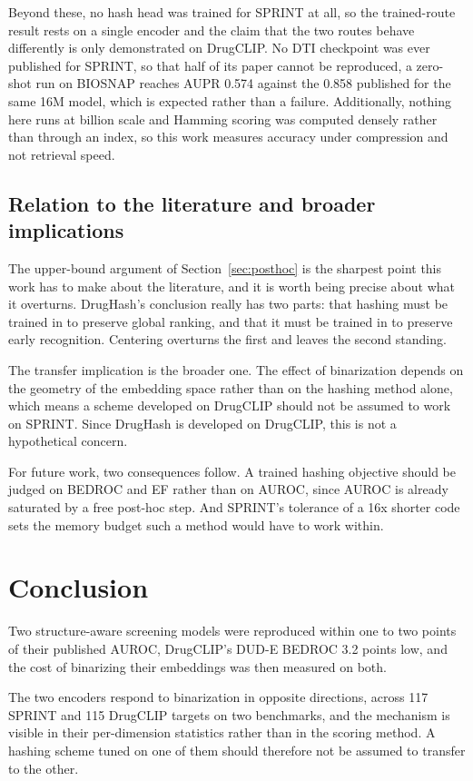 \documentclass[10pt,a4paper]{article}
\begin{document}
Beyond these, no hash head was trained for SPRINT at all, so the trained-route result rests on
a single encoder and the claim that the two routes behave differently is only demonstrated on
DrugCLIP. No DTI checkpoint was ever published for SPRINT, so that half of its paper cannot be 
reproduced, a zero-shot run on BIOSNAP reaches AUPR 0.574 against the 0.858 published for the
same 16M model, which is expected
rather than a failure. Additionally, nothing here runs at billion scale and Hamming scoring was 
computed densely rather than through an index, so this work measures accuracy under compression and not 
retrieval speed.

\subsection{Relation to the literature and broader implications}

The upper-bound argument of Section~\ref{sec:posthoc} is the sharpest point this work has to make about
the literature, and it is worth being precise about what it overturns. DrugHash's conclusion
really has two parts: that hashing must be trained in to preserve global ranking, and that it
must be trained in to preserve early recognition. Centering overturns the first and leaves the
second standing.

The transfer implication is the broader one. The effect of binarization depends on the geometry of the 
embedding space rather than on the hashing method alone, which means a scheme developed on DrugCLIP should 
not be assumed to work on SPRINT. Since DrugHash is developed on DrugCLIP, this is not a hypothetical concern.

For future work, two consequences follow. A trained hashing objective should be judged on BEDROC and EF 
rather than on AUROC, since AUROC is already saturated by a free post-hoc step. And SPRINT's tolerance of 
a 16x shorter code sets the memory budget such a method would have to work within.

\section{Conclusion}\label{sec:conclusion}

Two structure-aware screening models were reproduced within one to two points of their published
AUROC, DrugCLIP's DUD-E BEDROC 3.2 points low, and 
the cost of binarizing their embeddings was then measured on both.

The two encoders respond to binarization in opposite directions, across 117 SPRINT and 115
DrugCLIP targets on two benchmarks, and the mechanism is visible in their per-dimension statistics rather than in the scoring method. 
A hashing scheme tuned on one of them should therefore not be assumed to transfer to the other. 
\end{document}
